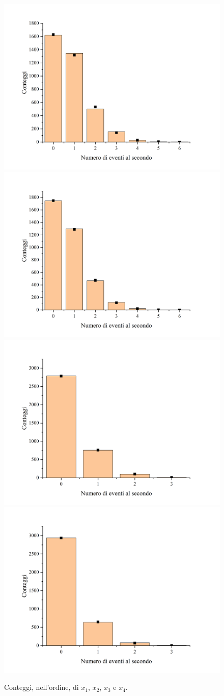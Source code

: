 \documentclass{article}
\begin{document}
\begin{center}
    \begin{figure}[H]
        \includegraphics[trim={2cm .5cm 2.4cm 2.1cm},clip,width=.5\textwidth]{img/Geiger2.jpg}
        \includegraphics[trim={2cm .5cm 2.4cm 2.1cm},clip,width=.5\textwidth]{img/Geiger1.jpg}
        \includegraphics[trim={2cm .5cm 2.4cm 2.1cm},clip,width=.5\textwidth]{img/Geiger4.jpg}
        \includegraphics[trim={2cm .5cm 2.4cm 2.1cm},clip,width=.5\textwidth]{img/Geiger5.jpg}
        \caption*{Conteggi, nell'ordine, di $x_1$, $x_2$, $x_3$ e $x_4$.}

\end{figure}
\end{center}
\end{document}
